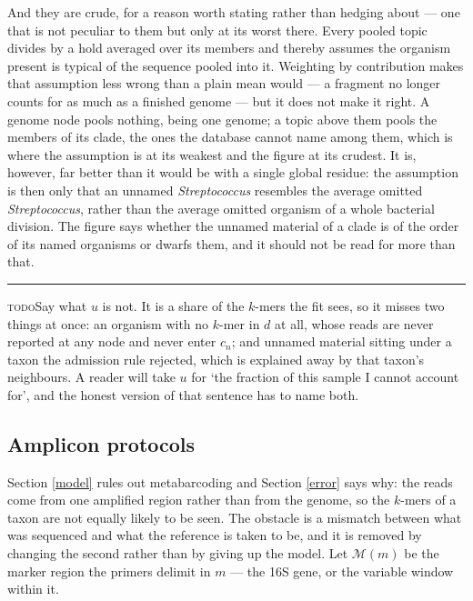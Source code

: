 \documentclass[pdflatex,sn-vancouver-num]{sn-jnl}
\newif\ifshowtodos \showtodostrue
\newcommand{\todo}[1]{%
  \ifshowtodos
    \par\addvspace{0.7\baselineskip}%
    \begin{list}{}{%
      \setlength{\leftmargin}{1.5em}%
      \setlength{\rightmargin}{1.5em}%
      \setlength{\topsep}{0pt}%
      \setlength{\partopsep}{0pt}%
      \setlength{\parsep}{0.5\baselineskip}%
      \setlength{\itemsep}{0pt}%
    }%
    \item[]\footnotesize\color{black!70}%
      \textcolor{orange!65!black}{\rule[-0.2ex]{2pt}{1.15ex}}\hspace{0.55em}%
      \textcolor{orange!65!black}{\textsc{todo}}\hspace{0.6em}\ignorespaces#1%
    \end{list}%
    \addvspace{0.7\baselineskip}%
  \fi%
}
\begin{document}
    And they are crude, for a reason worth stating rather than hedging about --- one that is not
    peculiar to them but only at its worst there. Every pooled topic divides by a hold averaged over
    its members and thereby assumes the organism present is typical of the sequence pooled into it.
    Weighting by contribution makes that assumption less wrong than a plain mean would --- a
    fragment no longer counts for as much as a finished genome --- but it does not make it right. A genome node pools nothing,
    being one genome; a topic above them pools the members of its clade, the ones the database cannot
    name among them, which is where the assumption is at its weakest and the figure at its crudest.
    It is, however, far better than it would be with a single global residue: the assumption is then
    only that an unnamed \emph{Streptococcus} resembles the
    average omitted \emph{Streptococcus}, rather than the average omitted organism of a whole
    bacterial division. The figure says whether the unnamed material of a clade is of the order of its
    named organisms or dwarfs them, and it should not be read for more than that.

    \todo{Say what $u$ is not. It is a share of the $k$-mers the fit sees, so it misses two things at
    once: an organism with no $k$-mer in $d$ at all, whose reads are never reported at any node and
    never enter $c_n$; and unnamed material sitting under a taxon the admission rule rejected, which
    is explained away by that taxon's neighbours. A reader will take $u$ for `the fraction of this
    sample I cannot account for', and the honest version of that sentence has to name both.}

    \subsection{Amplicon protocols}\label{amplicon}
    Section \ref{model} rules out metabarcoding and Section \ref{error} says why: the reads come from
    one amplified region rather than from the genome, so the $k$-mers of a taxon are not equally
    likely to be seen. The obstacle is a mismatch between what was sequenced and what the reference
    is taken to be, and it is removed by changing the second rather than by giving up the model. Let
    $\mathcal{M}(m)$ be the marker region the primers delimit in $m$ --- the 16S gene, or the
    variable window within it.
\end{document}
